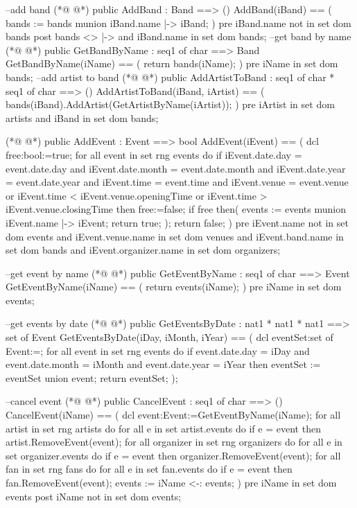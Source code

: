 \begin{vdmpp}[breaklines=true]
 --add band
(*@
\label{AddBand:89}
@*)
  public  AddBand : Band  ==> ()
  AddBand(iBand) == (
    bands := bands munion {iBand.name |-> iBand};
 )
  pre
   iBand.name not in set dom bands
  post 
  bands <> { |-> } and iBand.name in set dom bands;
  --get band by name
(*@
\label{GetBandByName:98}
@*)
  public GetBandByName : seq1 of char ==> Band
  GetBandByName(iName) == (
   return bands(iName);
  )
  pre iName in set dom bands;
  --add artist to band
(*@
\label{AddArtistToBand:104}
@*)
  public AddArtistToBand : seq1 of char * seq1 of char ==> ()
  AddArtistToBand(iBand, iArtist) == (
   bands(iBand).AddArtist(GetArtistByName(iArtist));
  )
  pre
   iArtist in set dom artists and
  iBand in set dom bands;


(*@
\label{AddEvent:113}
@*)
  public  AddEvent : Event  ==> bool
  AddEvent(iEvent) == (
   dcl free:bool:=true;
   for all event in set rng events do
    if iEvent.date.day = event.date.day and iEvent.date.month = event.date.month and iEvent.date.year = event.date.year and iEvent.time = event.time and iEvent.venue = event.venue or 
     iEvent.time < iEvent.venue.openingTime or iEvent.time > iEvent.venue.closingTime
    then free:=false;
   if free then(
     events := events munion {iEvent.name |-> iEvent};
     return true;
    );
    return false;
 )
 pre
  iEvent.name not in set dom events and
  iEvent.venue.name in set dom venues and
  iEvent.band.name in set dom bands and
  iEvent.organizer.name in set dom organizers;
  
  --get event by name
(*@
\label{GetEventByName:133}
@*)
  public GetEventByName : seq1 of char ==> Event
  GetEventByName(iName) == (
   return events(iName);
  )
  pre iName in set dom events;
  
  --get events by date
(*@
\label{GetEventsByDate:140}
@*)
  public GetEventsByDate : nat1 * nat1 * nat1 ==> set of Event
  GetEventsByDate(iDay, iMonth, iYear) == (
   dcl eventSet:set of Event:={};
   for all event in set rng events do
    if event.date.day = iDay and event.date.month = iMonth and event.date.year = iYear then eventSet := eventSet union {event};
   return eventSet;
  );
  
  --cancel event
(*@
\label{CancelEvent:149}
@*)
 public CancelEvent : seq1 of char ==> ()
 CancelEvent(iName) == (
  dcl event:Event:=GetEventByName(iName);
   for all artist in set rng artists do
    for all e in set artist.events do
     if e = event then artist.RemoveEvent(event);
   for all organizer in set rng organizers do
    for all e in set organizer.events do
     if e = event then organizer.RemoveEvent(event);
   for all fan in set rng fans do
    for all e in set fan.events do
     if e = event then fan.RemoveEvent(event);
  events :=  {iName} <-: events;
 )
 pre
  iName in set dom events
 post
  iName not in set dom events;
  

\end{vdmpp}
